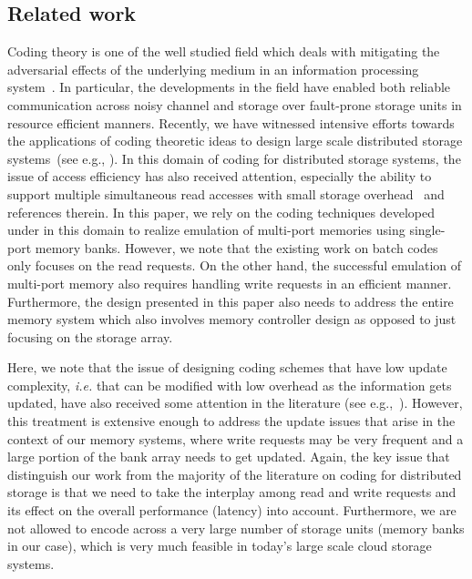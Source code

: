 \subsection{Related work}

Coding theory is one of the well studied field which deals with mitigating the adversarial effects of the underlying medium in an information processing system~\cite{MacSlo, Cover}. In particular, the developments in the field have enabled both reliable communication across noisy channel and storage over fault-prone storage units in resource efficient manners. Recently, we have witnessed intensive efforts towards the applications of coding theoretic ideas to design large scale distributed storage systems~(see e.g., \cite{Azure, SAPDVCB13, Rashmi14}). In this domain of coding for distributed storage systems, the issue of access efficiency has also received attention, especially the ability to support multiple simultaneous read accesses with small storage overhead~\cite{batchcodes, RPDV16, RSDG16, Wang2017} and references therein. In this paper, we rely on the coding techniques developed under in this domain to realize emulation of multi-port memories using single-port memory banks. However, we note that the existing work on batch codes~\cite{batchcodes} only focuses on the read requests. On the other hand, the successful emulation of multi-port memory also requires handling write requests in an efficient manner. Furthermore, the design presented in this paper also needs to address the entire memory system which also involves memory controller design as opposed to just focusing on the storage array. 


Here, we note that the issue of designing coding schemes that have low update complexity, \textit{i.e.} that can be modified with low overhead as the information gets updated, have also received some attention in the literature (see e.g.,~\cite{ASV10, MCW14}). However, this treatment is extensive enough to address the update issues that arise in the context of our memory systems, where write requests may be very frequent and a large portion of the bank array needs to get updated. Again, the key issue that distinguish our work from the majority of the literature on coding for distributed storage is that we need to take the interplay among read and write requests and its effect on the overall performance (latency) into account. Furthermore, we  are not allowed to encode across a very large number of storage units (memory banks in our case), which is very much feasible in today's large scale cloud storage systems.

